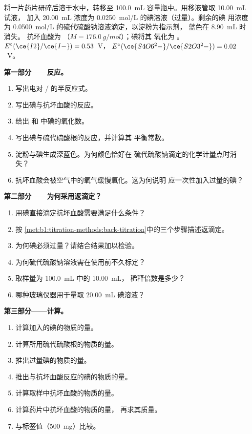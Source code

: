 \begin{problem}
\label{pb:b1:titration-methods:1}
将一片药片研碎后溶于水中，转移至 \qty{100.0}{mL}
容量瓶中。用移液管取 \qty{10.00}{mL} 试液，
加入 \qty{20.00}{mL} 浓度为 \qty{0.0250}{mol/L} 的碘溶液（过量）。剩余的碘
用浓度为 \qty{0.0500}{mol/L} 的硫代硫酸钠溶液滴定，以淀粉为指示剂，
蓝色在 \qty{8.90}{mL} 时消失。
抗坏血酸为 （$M = \qty{176.0}{g/mol}$）；碘将其
氧化为 。$E^\circ(\ce{I2}/\ce{I-}) = 0.53$~V，
$E^\circ(\ce{S4O6^2-}/\ce{S2O3^2-}) = 0.02$~V。

\medskip
\noindent\textbf{第一部分——反应。}
\begin{enumerate}
  \item 写出电对 / 的半反应式。
  \item 写出碘与抗坏血酸的反应。
  \item 给出  和  中碘的氧化数。
  \item 写出碘与硫代硫酸根的反应，并计算其
        平衡常数。
  \item 淀粉与碘生成深蓝色。为何颜色恰好在
        硫代硫酸钠滴定的化学计量点时消失？
  \item 抗坏血酸会被空气中的氧气缓慢氧化。这为何说明
        应一次性加入过量的碘？
\end{enumerate}

\medskip
\noindent\textbf{第二部分——为何采用返滴定？}
\begin{enumerate}[resume]
  \item 用碘直接滴定抗坏血酸需要满足什么条件？
  \item 按
        \cref{met:b1:titration-methods:back-titration}中的三个步骤描述返滴定。
  \item 为何碘必须过量？请结合结果加以检验。
  \item 为何硫代硫酸钠溶液需在使用前不久标定？
  \item 取样量为 \qty{100.0}{mL} 中的 \qty{10.00}{mL}，
        稀释倍数是多少？
  \item 哪种玻璃仪器用于量取 \qty{20.00}{mL} 碘溶液？
\end{enumerate}

\medskip
\noindent\textbf{第三部分——计算。}
\begin{enumerate}[resume]
  \item 计算加入的碘的物质的量。
  \item 计算所用硫代硫酸根的物质的量。
  \item 推出过量碘的物质的量。
  \item 推出与抗坏血酸反应的碘的物质的量。
  \item 计算取样中抗坏血酸的物质的量。
  \item 计算药片中抗坏血酸的物质的量，
        再求其质量。
  \item 与标签值（\qty{500}{mg}）比较。
\end{enumerate}


\end{problem}
